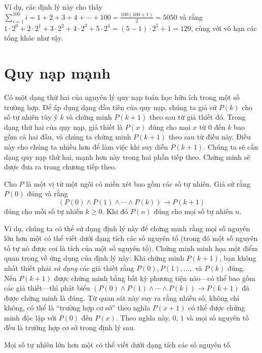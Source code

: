 Ví dụ, các định lý này cho thấy $\displaystyle\sum_{i=1}^{100} i = 1 + 2 + 3 + 4 + \cdots + 100 = \frac{100(100+1)}{2} = 5050$ và rằng $1 \cdot 2^0 + 2 \cdot 2^1 + 3 \cdot 2^2 + 4 \cdot 2^3 + 5 \cdot 2^4 = (5-1) \cdot 2^5 + 1 = 129$, cùng với vô hạn các tổng khác như vậy.

\section{Quy nạp mạnh}

Có một dạng thứ hai của nguyên lý quy nạp toán học hữu ích trong một số trường hợp. Để áp dụng dạng đầu tiên của quy nạp, chúng ta giả sử $P(k)$ cho số tự nhiên tùy ý $k$ và chứng minh $P(k+1)$ theo sau từ giả thiết đó. Trong dạng thứ hai của quy nạp, giả thiết là $P(x)$ đúng cho mọi $x$ từ $0$ đến $k$ bao gồm cả hai đầu, và chúng ta chứng minh $P(k+1)$ theo sau từ điều này. Điều này cho chúng ta nhiều hơn để làm việc khi suy diễn $P(k+1)$. Chúng ta sẽ cần dạng quy nạp thứ hai, mạnh hơn này trong hai phần tiếp theo. Chứng minh sẽ được đưa ra trong chương tiếp theo.

\begin{theorem}
Cho $P$ là một vị từ một ngôi có miền xét bao gồm các số tự nhiên. Giả sử rằng $P(0)$ đúng và rằng
\[(P(0) \wedge P(1) \wedge \cdots \wedge P(k)) \to P(k+1)\]
đúng cho mỗi số tự nhiên $k \geq 0$. Khi đó $P(n)$ đúng cho mọi số tự nhiên $n$.
\end{theorem}

Ví dụ, chúng ta có thể sử dụng định lý này để chứng minh rằng mọi số nguyên lớn hơn một có thể viết dưới dạng tích các số nguyên tố (trong đó một số nguyên tố tự nó được coi là tích của một số nguyên tố). Chứng minh minh họa một điểm quan trọng về ứng dụng của định lý này: Khi chứng minh $P(k+1)$, bạn không nhất thiết phải \emph{sử dụng} các giả thiết rằng $P(0), P(1), \ldots,$ và $P(k)$ đúng. Nếu $P(k+1)$ được chứng minh bằng bất kỳ phương tiện nào---có thể bao gồm các giả thiết---thì phát biểu $(P(0) \wedge P(1) \wedge \cdots \wedge P(k)) \to P(k+1)$ đã được chứng minh là đúng. Từ quan sát này suy ra rằng nhiều số, không chỉ không, có thể là ``trường hợp cơ sở'' theo nghĩa $P(x+1)$ có thể được chứng minh độc lập với $P(0)$ đến $P(x)$. Theo nghĩa này, $0$, $1$ và mọi số nguyên tố đều là trường hợp cơ sở trong định lý sau.

\begin{theorem}
Mọi số tự nhiên lớn hơn một có thể viết dưới dạng tích các số nguyên tố.
\end{theorem}

